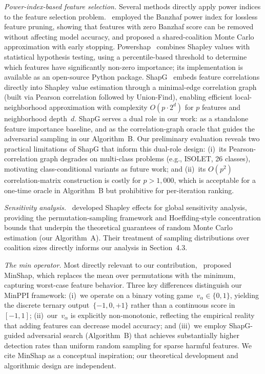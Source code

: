 \documentclass{article} %
\begin{document}
{\em Power-index-based feature selection.} Several methods directly apply power indices to the feature selection problem.~\citet{karavas2017feature} employed the Banzhaf power index for lossless feature pruning, showing that features with zero Banzhaf score can be removed without affecting model accuracy, and proposed a shared-coalition Monte Carlo approximation with early stopping. Powershap~\citep{verhaeghe2022powershap} combines Shapley values with statistical hypothesis testing, using a percentile-based threshold to determine which features have significantly non-zero importance; its implementation is available as an open-source Python package. ShapG~\citep{zhao2025shapg} embeds feature correlations directly into Shapley value estimation through a minimal-edge correlation graph (built via Pearson correlation followed by Union-Find), enabling efficient local-neighborhood approximation with complexity $O(p \cdot 2^d)$ for $p$ features and neighborhood depth~$d$. ShapG serves a dual role in our work: as a standalone feature importance baseline, and as the correlation-graph oracle that guides the adversarial sampling in our Algorithm~B. Our preliminary evaluation reveals two practical limitations of ShapG that inform this dual-role design: (i)~its Pearson-correlation graph degrades on multi-class problems (e.g., ISOLET, 26 classes), motivating class-conditional variants as future work; and (ii)~its $O(p^2)$ correlation-matrix construction is costly for $p > 1{,}000$, which is acceptable for a one-time oracle in Algorithm~B but prohibitive for per-iteration ranking.

{\em Sensitivity analysis.}~\citet{song2016shapley} developed Shapley effects for global sensitivity analysis, providing the permutation-sampling framework and Hoeffding-style concentration bounds that underpin the theoretical guarantees of random Monte Carlo estimation (our Algorithm~A). Their treatment of sampling distributions over coalition sizes directly informs our analysis in Section~4.3.

{\em The min operator.} Most directly relevant to our contribution,~\citet{zheng2026minshap} proposed MinShap, which replaces the mean over permutations with the minimum, capturing worst-case feature behavior. Three key differences distinguish our MinPPI framework: (i)~we operate on a binary voting game~$v_\alpha \in \{0,1\}$, yielding the discrete ternary output~$\{-1, 0, +1\}$ rather than a continuous score in~$[-1, 1]$; (ii)~our~$v_\alpha$ is explicitly non-monotonic, reflecting the empirical reality that adding features can decrease model accuracy; and (iii)~we employ ShapG-guided adversarial search (Algorithm~B) that achieves substantially higher detection rates than uniform random sampling for sparse harmful features. We cite MinShap as a conceptual inspiration; our theoretical development and algorithmic design are independent.
\end{document}
